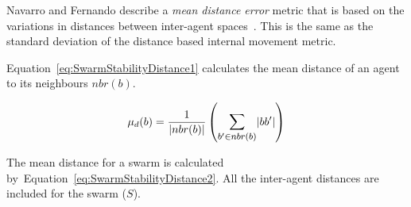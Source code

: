 \documentclass{ieeeaccess}
\begin{document}

Navarro and Fernando describe a \textit{mean distance error} metric that is based on the variations in distances between inter-agent spaces~\cite{NIM:09}. This is the same as the standard deviation of the distance based internal movement metric. 



Equation~\ref{eq:SwarmStabilityDistance1} calculates the mean distance of an agent to its neighbours $nbr(b)$. 

\begin{equation}
\label{eq:SwarmStabilityDistance1}
\mu_d(b) = \frac{1}{\mathlarger{|nbr(b)|}}\left({\mathlarger{\sum_{b' \in nbr(b)}}|bb'|}\right)
\end{equation}

The mean distance for a swarm is calculated by~Equation~\ref{eq:SwarmStabilityDistance2}. All the inter-agent distances are included for the swarm ($S$). 

\end{document}
